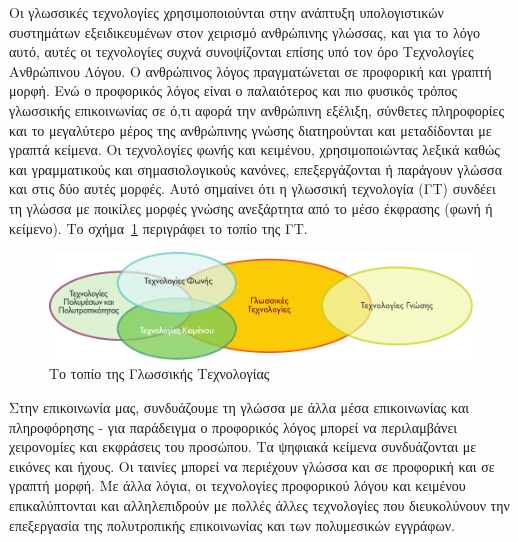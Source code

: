 \documentclass[]{../../metanetpaper}
\begin{document}
\clearpage



\begin{multicols}{2}

Οι γλωσσικές τεχνολογίες χρησιμοποιούνται στην ανάπτυξη υπολογιστικών συστημάτων εξειδικευμένων στον χειρισμό ανθρώπινης γλώσσας, και για το λόγο αυτό, αυτές οι τεχνολογίες συχνά συνοψίζονται επίσης υπό τον όρο Τεχνολογίες Ανθρώπινου Λόγου. Ο  ανθρώπινος λόγος πραγματώνεται σε προφορική και γραπτή μορφή. Ενώ ο προφορικός λόγος είναι ο παλαιότερος και πιο φυσικός τρόπος γλωσσικής επικοινωνίας σε ό,τι αφορά την ανθρώπινη εξέλιξη, σύνθετες πληροφορίες και το μεγαλύτερο μέρος της ανθρώπινης γνώσης διατηρούνται και μεταδίδονται με γραπτά κείμενα. Οι τεχνολογίες φωνής και κειμένου, χρησιμοποιώντας λεξικά καθώς και γραμματικούς και σημασιολογικούς κανόνες, επεξεργάζονται ή παράγουν γλώσσα και στις δύο αυτές μορφές. Αυτό σημαίνει ότι η γλωσσική τεχνολογία (ΓΤ) συνδέει τη γλώσσα με ποικίλες μορφές γνώσης ανεξάρτητα από το μέσο έκφρασης (φωνή ή κείμενο). Το σχήμα~\ref{fig:ltincontext_de} περιγράφει το τοπίο της ΓΤ.

\begin{figure}[htb]
  \center
  \includegraphics[width=\textwidth]{../_media/greek/language_technologies}
  \caption{Το τοπίο της Γλωσσικής Τεχνολογίας}
  \label{fig:ltincontext_de}
\end{figure}

Στην επικοινωνία μας, συνδυάζουμε τη γλώσσα με άλλα μέσα επικοινωνίας και πληροφόρησης - για παράδειγμα ο προφορικός λόγος μπορεί να περιλαμβάνει χειρονομίες και εκφράσεις του προσώπου. Τα ψηφιακά κείμενα συνδυάζονται με εικόνες και ήχους. Οι ταινίες μπορεί να περιέχουν γλώσσα και σε προφορική και σε γραπτή μορφή. Με άλλα λόγια, οι τεχνολογίες προφορικού λόγου και κειμένου επικαλύπτονται και αλληλεπιδρούν με πολλές άλλες τεχνολογίες που διευκολύνουν την επεξεργασία της πολυτροπικής επικοινωνίας και των πολυμεσικών εγγράφων. 


\end{multicols}
\end{document}
